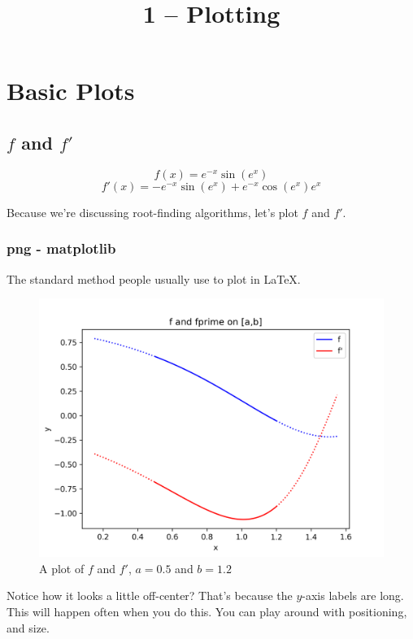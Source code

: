 \documentclass{article}
\title{1 -- Plotting}
\begin{document}
\maketitle

\section{Basic Plots}
\subsection{$f$ and $f'$}

\[
  f(x) = e^{-x} \sin(e^x)
\]
\[
  f'(x) = -e^{-x} \sin(e^x) + e^{-x} \cos(e^x) e^x
\]

Because we're discussing root-finding algorithms, let's plot $f$ and $f'$.

\subsubsection{png - matplotlib}

The standard method people usually use to plot in LaTeX.

\begin{figure}[h]
  \centering
  \includegraphics[scale=0.6]{./plots/ffp}
  \caption{A plot of $f$ and $f'$, $a = 0.5$ and $b = 1.2$}
\end{figure}

Notice how it looks a little off-center?
That's because the $y$-axis labels are long.
This will happen often when you do this.
You can play around with positioning, and size.
\end{document}
